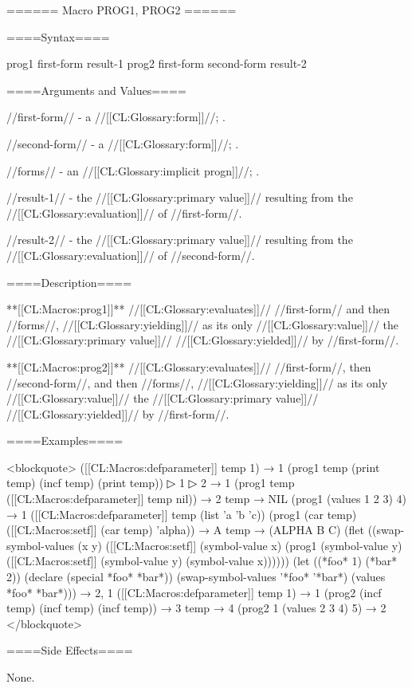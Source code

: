 ====== Macro PROG1, PROG2 ======

====Syntax====

\DefmacWithValues prog1 {first-form } {result-1} \DefmacWithValues prog2 {first-form second-form } {result-2}

====Arguments and Values====

//first-form// - a //[[CL:Glossary:form]]//; \evalspecial.

//second-form// - a //[[CL:Glossary:form]]//; \evalspecial.

//forms// - an //[[CL:Glossary:implicit progn]]//; \evalspecial.

//result-1// - the //[[CL:Glossary:primary value]]// resulting from the //[[CL:Glossary:evaluation]]// of //first-form//.

//result-2// - the //[[CL:Glossary:primary value]]// resulting from the //[[CL:Glossary:evaluation]]// of //second-form//.

====Description====

**[[CL:Macros:prog1]]** //[[CL:Glossary:evaluates]]// //first-form// and then //forms//, //[[CL:Glossary:yielding]]// as its only //[[CL:Glossary:value]]// the //[[CL:Glossary:primary value]]// //[[CL:Glossary:yielded]]// by //first-form//.

**[[CL:Macros:prog2]]** //[[CL:Glossary:evaluates]]// //first-form//, then //second-form//, and then //forms//, //[[CL:Glossary:yielding]]// as its only //[[CL:Glossary:value]]// the //[[CL:Glossary:primary value]]// //[[CL:Glossary:yielded]]// by //first-form//.

====Examples====

<blockquote> ([[CL:Macros:defparameter]] temp 1) → 1 (prog1 temp (print temp) (incf temp) (print temp))
▷ 1
▷ 2 → 1 (prog1 temp ([[CL:Macros:defparameter]] temp nil)) → 2 temp → NIL (prog1 (values 1 2 3) 4) → 1 ([[CL:Macros:defparameter]] temp (list 'a 'b 'c)) (prog1 (car temp) ([[CL:Macros:setf]] (car temp) 'alpha)) → A temp → (ALPHA B C) (flet ((swap-symbol-values (x y) ([[CL:Macros:setf]] (symbol-value x) (prog1 (symbol-value y) ([[CL:Macros:setf]] (symbol-value y) (symbol-value x)))))) (let ((*foo* 1) (*bar* 2)) (declare (special *foo* *bar*)) (swap-symbol-values '*foo* '*bar*) (values *foo* *bar*))) → 2, 1 ([[CL:Macros:defparameter]] temp 1) → 1 (prog2 (incf temp) (incf temp) (incf temp)) → 3 temp → 4 (prog2 1 (values 2 3 4) 5) → 2 </blockquote>

====Side Effects====

None.

